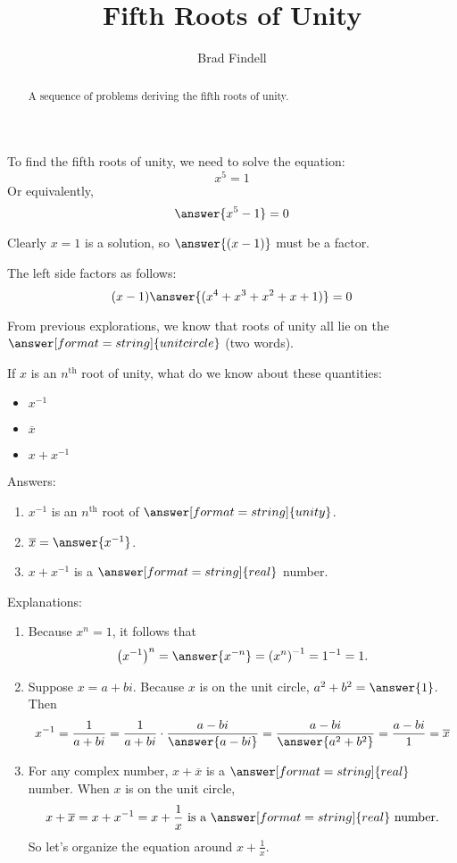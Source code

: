 \documentclass[space,nooutcomes]{ximera}
\title{Fifth Roots of Unity}
\author{Brad Findell}
\begin{document}
\begin{abstract}
A sequence of problems deriving the fifth roots of unity.   
\end{abstract}
\maketitle



\begin{problem}

To find the fifth roots of unity, we need to solve the equation: 
\[
x^5 = 1
\]
Or equivalently, 
\[
\answer{x^5 - 1} = 0
\]

\begin{problem}
Clearly $x=1$ is a solution, so $\answer{(x-1)}$ must be a factor.  

\begin{problem}
The left side factors as follows: 
\[
(x-1)\answer{(x^4+x^3+x^2+x+1)}=0
\]
\end{problem}
\end{problem}
\end{problem}

\begin{problem}
From previous explorations, we know that roots of unity all lie on the $\answer[format=string]{unit circle}$ (two words). 

If $x$ is an $n^\text{th}$ root of unity, what do we know about these quantities: 
\begin{itemize}
\item $x^{-1}$ 
\item $\overline{x}$
\item $x+x^{-1}$
\end{itemize}

Answers:
\begin{enumerate}
\item $x^{-1}$ is an $n^\text{th}$ root of $\answer[format=string]{unity}$.  
\item $\overline{x} = \answer{x^{-1}}$. 
\item $x+x^{-1}$ is a $\answer[format=string]{real}$ number.  
\end{enumerate}
\begin{problem}
Explanations: 
\begin{enumerate}
\item Because $x^n=1$, it follows that 
\[
\left(x^{-1}\right)^n = \answer{x^{-n}} = \left(x^n\right)^{-1} = 1^{-1} = 1. 
\]
\item Suppose $x=a+bi$. Because $x$ is on the unit circle, $a^2+b^2 = \answer{1}$.  Then 
\[
x^{-1}=\frac{1}{a+bi}=\frac{1}{a+bi}\cdot\frac{a-bi}{\answer{a-bi}}=\frac{a-bi}{\answer{a^2+b^2}}=\frac{a-bi}{1}=\overline{x}
\]
\item For any complex number, $x+\overline{x}$ is a $\answer[format=string]{real}$ number.  When $x$ is on the unit circle, 
\[
x + \overline{x} = x + x^{-1} = x + \frac{1}{x}\text{ is a }\answer[format=string]{real}\text{ number.}
\]
So let's organize the equation around $x + \frac{1}{x}$.  
\end{enumerate}
\end{problem}
\end{problem}
\end{document}
